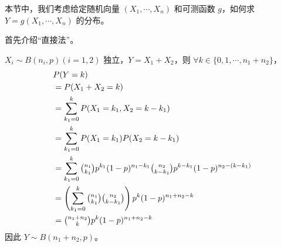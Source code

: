 \documentclass[../main.tex]{subfiles}
\begin{document}
本节中，我们考虑给定随机向量 $(X_1,\cdots,X_n)$ 和可测函数 $g$，如何求 $Y=g(X_1,\cdots,X_n)$ 的分布。

首先介绍“直接法”。

\begin{example}
    $X_i\sim B(n_i,p)(i=1,2)$ 独立，$Y=X_1+X_2$，则 $\forall k\in\{0,1,\cdots,n_1+n_2\}$，
    \begin{equation}
        \begin{aligned}
             & P(Y=k)\nonumber                                                                                                \\
             & =P(X_1+X_2=k)\nonumber                                                                                         \\
             & =\sum_{k_1=0}^kP(X_1=k_1,X_2=k-k_1)\nonumber                                                                   \\
             & =\sum_{k_1=0}^kP(X_1=k_1)P(X_2=k-k_1)\nonumber                                                                 \\
             & =\sum_{k_1=0}^k\tbinom{n_1}{k_1}p^{k_1}(1-p)^{n_1-k_1}\tbinom{n_2}{k-k_1}p^{k-k_1}(1-p)^{n_2-(k-k_1)}\nonumber \\
             & =\left(\sum_{k_1=0}^k\tbinom{n_1}{k_1}\tbinom{n_2}{k-k_1}\right)p^k(1-p)^{n_1+n_2-k}\nonumber                  \\
             & =\tbinom{n_1+n_2}{k}p^k(1-p)^{n_1+n_2-k}
        \end{aligned}
    \end{equation}
    因此 $Y\sim B(n_1+n_2,p)$。
\end{example}
\end{document}
